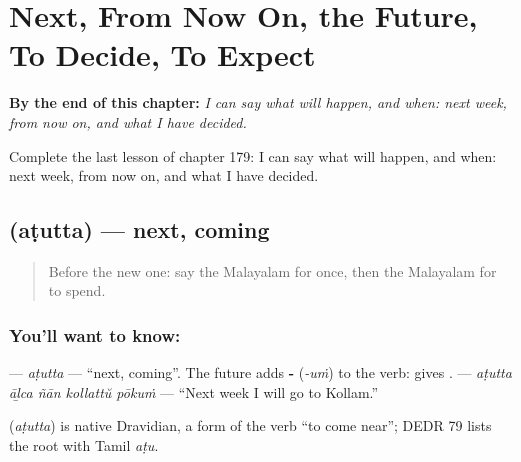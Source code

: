 
\chapter{Next, From Now On, the Future, To Decide, To Expect}
\label{ch:ml-next-from-now-on-the-future-to-decide-to-expect}

\begin{chapteropening}
\textbf{By the end of this chapter:} \emph{I can say what will happen, and when: next week, from now on, and what I have decided.}

Complete the last lesson of chapter 179: I can say what will happen, and when: next week, from now on, and what I have decided.
\end{chapteropening}

\section[\texorpdfstring{\ml{അടുത്ത} (aṭutta)}{അടുത്ത (aṭutta)}]{ (aṭutta) — next, coming}

\label{lesson:ML-C179-atutta}



\begin{quote}
Before the new one: say the Malayalam for once, then the Malayalam for to spend.
\end{quote}

\subsection*{You'll want to know: }
\textbf{} — \emph{aṭutta} — \textquotedblleft{}next, coming\textquotedblright{}. The future adds \textbf{-} (\emph{-uṁ}) to the verb: \textbf{} gives \textbf{}. \textbf{    } — \emph{aṭutta āḻca ñān kollattŭ pōkuṁ} — \textquotedblleft{}Next week I will go to Kollam.\textquotedblright{}

\begin{cousinweb}
\textbf{} (\emph{aṭutta}) is native Dravidian, a form of the verb \textquotedblleft{}to come near\textquotedblright{}; DEDR 79 lists the root with Tamil \emph{aṭu}.
\end{cousinweb}

